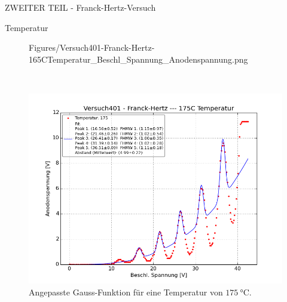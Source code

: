 \begin{appendix}
\begin{chapter}{ZWEITER TEIL - Franck-Hertz-Versuch}
\begin{section}{Temperatur}
\begin{figure}[ht!]
\begin{minipage}{0.48\textwidth}
              {Figures/Versuch401-Franck-Hertz-165CTemperatur_Beschl_Spannung_Anodenspannung.png}
          \caption{Angepasste Gauss-Funktion für eine Temperatur von 
              $\SI{165}{\celsius}$.}
          \label{fig:AnhangFHT165C}
        \end{minipage} \\
        \begin{minipage}{0.48\textwidth}
          \centering
          \includegraphics[width=\textwidth]
              {Figures/Versuch401-Franck-Hertz-175CTemperatur_Beschl_Spannung_Anodenspannung.png}
          \caption{Angepasste Gauss-Funktion für eine Temperatur von 
              $\SI{175}{\celsius}$.}
          \label{fig:AnhangFHT175C}
        \end{minipage}
      \end{figure}
      
    \end{section}
    
  \end{chapter}
  
\end{appendix}
 